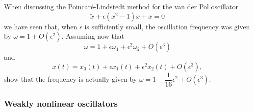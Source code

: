 \bigskip

\begin{problem}
  When discussing the Poincaré-Lindstedt method for the van der Pol oscillator
  \[
  \ddot{x} + \epsilon \left( x^2 - 1 \right) \dot{x} + x = 0
  \]
  we have seen that, when $\epsilon$ is sufficiently small, the oscillation frequency was given by $\omega = 1 + O(\epsilon^2)$.
  Assuming now that
  \[
  \omega = 1 + \epsilon \omega_1 + \epsilon^2 \omega_2 + O(\epsilon^3)
  \]
  and
  \[
  x(t) = x_0(t) + \epsilon x_1(t) + \epsilon^2 x_2(t) + O(\epsilon^3),
  \]
  show that the frequency is actually given by $\omega = 1 - \dfrac{1}{16} \epsilon^2 + O(\epsilon^3)$.
\end{problem}

\subsubsection*{Weakly nonlinear oscillators}

